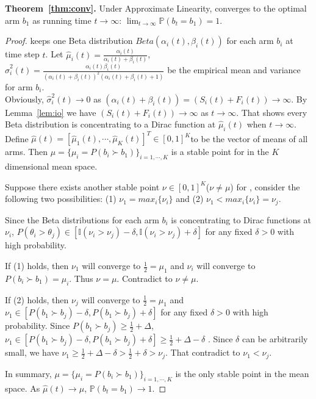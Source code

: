\textbf{Theorem~\ref{thm:conv}.}
Under Approximate Linearity, \multisparring converges to the optimal arm $b_1$ as running time $t\rightarrow \infty$: $\lim_{t\rightarrow \infty} \mathbb{P}(b_t = b_1) = 1$.
\begin{proof}
\multisparring keeps one Beta distribution $ Beta(\alpha_i(t),\beta_i(t))$ for each arm $b_i$ at time step $t$. Let $\hat{\mu}_i(t)= \frac{\alpha_i(t)}{\alpha_i(t) + \beta_i(t)}$, $\hat{\sigma}^2_i(t) = \frac{\alpha_i(t)\beta_i(t)}{(\alpha_i(t) + \beta_i(t))^2(\alpha_i(t) + \beta_i(t) + 1)}$ be the empirical mean and variance for arm $b_i$. \\
Obviously,  $\hat{\sigma}^2_i(t) \rightarrow 0$ as $(\alpha_i(t) + \beta_i(t)) = (S_i(t)+F_i(t)) \rightarrow \infty$. By Lemma~\ref{lem:io} we have $(S_i(t)+F_i(t)) \rightarrow \infty$ as $t\rightarrow \infty$. That shows every Beta distribution is concentrating to a Dirac function at $\hat{\mu}_i(t)$ when $t\rightarrow \infty$. Define $\hat{\mu}(t) = [\hat{\mu}_1(t), \cdots, \hat{\mu}_K(t)]^T \in [0,1]^K$to be the vector of means of all arms. Then $\mu = \{\mu_i = P(b_i \succ b_1)\}_{i = 1, \cdots, K}$ is a stable point for \multisparring in the $K$ dimensional mean space. 


Suppose there exists another stable point $\nu \in [0,1]^K$($\nu \neq \mu$) for \multisparring, consider the following two possibilities: (1) $\nu_1 = max_i\{{\nu_i}\}$ and (2) $\nu_1 < max_i\{{\nu_i}\} = \nu_j$.

Since the Beta distributions for each arm $b_i$ is concentrating to Dirac functions at $\nu_i$, $P(\theta_i > \theta_j) \in [\mathbb{I}(\nu_i > \nu_j) -\delta, \mathbb{I}(\nu_i > \nu_j) + \delta]$ for any fixed $\delta > 0$ with high probability.

If (1) holds, then $\nu_1$ will converge to  $\frac{1}{2} = \mu_1$ and $\nu_i$ will converge to $P(b_i \succ b_1) = \mu_i$. Thus $\nu = \mu$. Contradict to $\nu \neq \mu$.

If (2) holds, then $\nu_j$ will converge to  $\frac{1}{2} = \mu_1$ and $\nu_1 \in [P(b_1 \succ b_j) - \delta, P(b_1 \succ b_j) + \delta]$ for any fixed $\delta>0$ with high probability. Since $P(b_1 \succ b_j) \geq \frac{1}{2}+ \Delta$, $\nu_1 \in [P(b_1 \succ b_j) - \delta, P(b_1 \succ b_j) + \delta] \geq \frac{1}{2} + \Delta - \delta$ . Since $\delta$ can be arbitrarily small, we have $\nu_1 \geq \frac{1}{2} + \Delta-\delta > \frac{1}{2}+\delta > \nu_j$. That contradict to $\nu_1 < \nu_j$.

In summary, $\mu = \{ \mu_i =P(b_i \succ b_1)\}_{i = 1, \cdots, K}$ is the only stable point in the mean space. As $\hat{\mu}(t) \rightarrow \mu$, $\mathbb{P}(b_t = b_1) \rightarrow 1$.


\end{proof}
